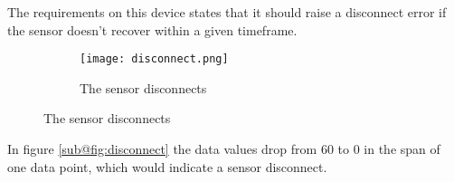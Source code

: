 The requirements on this device states that it should raise a disconnect error if the sensor doesn't recover within a given timeframe.

\begin{figure}[H]
\centering
	\begin{subfigure}[b]{0.3\textwidth}
    \texttt{[image: disconnect.png]}
    \caption{The sensor disconnects}
    \label{fig:disconnect}
	\end{subfigure}
\end{figure}

In figure \ref{sub@fig:disconnect} the data values drop from 60 to 0 in the span of one data point, which would indicate a sensor disconnect.
